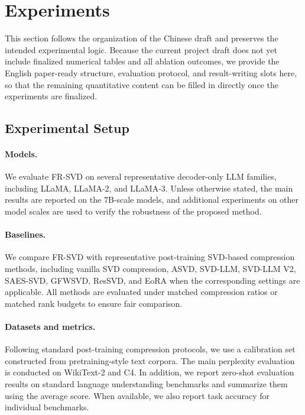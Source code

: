 \documentclass[a4paper,fleqn]{cas-dc}
\begin{document}
\section{Experiments}

This section follows the organization of the Chinese draft and preserves the intended experimental logic. Because the current project draft does not yet include finalized numerical tables and all ablation outcomes, we provide the English paper-ready structure, evaluation protocol, and result-writing slots here, so that the remaining quantitative content can be filled in directly once the experiments are finalized.

\subsection{Experimental Setup}

\paragraph{Models.}
We evaluate FR-SVD on several representative decoder-only LLM families, including LLaMA, LLaMA-2, and LLaMA-3. Unless otherwise stated, the main results are reported on the 7B-scale models, and additional experiments on other model scales are used to verify the robustness of the proposed method.

\paragraph{Baselines.}
We compare FR-SVD with representative post-training SVD-based compression methods, including vanilla SVD compression, ASVD, SVD-LLM, SVD-LLM V2, SAES-SVD, GFWSVD, ResSVD, and EoRA when the corresponding settings are applicable. All methods are evaluated under matched compression ratios or matched rank budgets to ensure fair comparison.

\paragraph{Datasets and metrics.}
Following standard post-training compression protocols, we use a calibration set constructed from pretraining-style text corpora. The main perplexity evaluation is conducted on WikiText-2 and C4. In addition, we report zero-shot evaluation results on standard language understanding benchmarks and summarize them using the average score. When available, we also report task accuracy for individual benchmarks.
\end{document}

